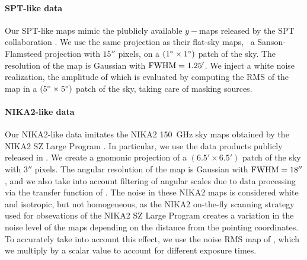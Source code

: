 \paragraph{SPT-like data}  %
Our SPT-like maps mimic the plublicly available $y-$maps released by the SPT collaboration \citep{bleem_cmbksz_2022}.
We use the same projection as their flat-sky maps, \ie\ a Sanson-Flamsteed projection with $15''$ pixels, on a $(1\degree \times 1\degree)$ patch of the sky.
The resolution of the map is Gaussian with ${\rm FWHM} = 1.25'$.
We inject a white noise realization, the amplitude of which is evaluated by computing the RMS of the map in a $(5\degree \times 5\degree)$ patch of the sky, taking care of masking sources.

\paragraph{NIKA2-like data}  %
Our NIKA2-like data imitates the NIKA2 150~GHz sky maps obtained by the NIKA2 SZ Large Program \citep{mayet_cluster_2020, perotto_nika2_2021}.
In particular, we use the data products publicly released in \citet{keruzore_exploiting_2020}.
We create a gnomonic projection of a $(6.5' \times 6.5')$ patch of the sky with $3''$ pixels.
The angular resolution of the map is Gaussian with ${\rm FWHM} = 18''$, and we also take into account filtering of angular scales due to data processing via the transfer function of \citet{keruzore_exploiting_2020}.
The noise in these NIKA2 maps is considered white and isotropic, but not homogeneous, as the NIKA2 on-the-fly scanning strategy used for obsevations of the NIKA2 SZ Large Program creates a variation in the noise level of the maps depending on the distance from the pointing coordinates.
To accurately take into account this effect, we use the noise RMS map of \citet{keruzore_exploiting_2020}, which we multiply by a scalar value to account for different exposure times.

